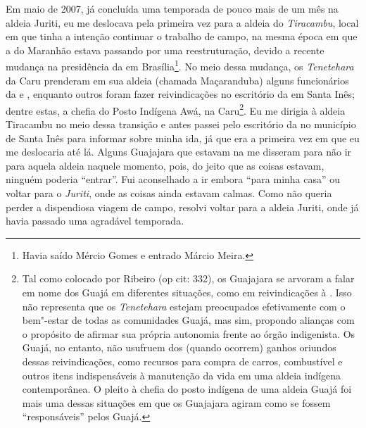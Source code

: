 Em maio de 2007, já concluída uma temporada de pouco mais de um mês na
aldeia Juriti, eu me deslocava pela primeira vez para a aldeia do 
\emph{Tiracambu}, local em que tinha a intenção continuar o trabalho de
campo, na mesma época em que a  do Maranhão estava passando por uma
reestruturação, devido a recente mudança na presidência da  em
Brasília\footnote{Havia saído Mércio Gomes e entrado Márcio Meira.}. No
meio dessa mudança, os \emph{Tenetehara} da  Caru prenderam em sua
aldeia (chamada Maçaranduba) alguns funcionários da  e ,
enquanto outros foram fazer reivindicações no escritório da  em
Santa Inês; dentre estas, a chefia do Posto Indígena Awá, na 
Caru\footnote{Tal como colocado por Ribeiro (op cit: 332), os Guajajara
  se arvoram a falar em nome dos Guajá em diferentes situações, como em
  reivindicações à . Isso não representa que os \emph{Tenetehara}
  estejam preocupados efetivamente com o bem"-estar de todas as
  comunidades Guajá, mas sim, propondo alianças com o propósito de
  afirmar sua própria autonomia frente ao órgão indigenista. Os Guajá,
  no entanto, não usufruem dos (quando ocorrem) ganhos oriundos dessas
  reivindicações, como recursos para compra de carros, combustível e
  outros itens indispensáveis à manutenção da vida em uma aldeia
  indígena contemporânea. O pleito à chefia do posto indígena de uma
  aldeia Guajá foi mais uma dessas situações em que os Guajajara agiram
  como se fossem ``responsáveis'' pelos Guajá.}. Eu me dirigia à aldeia
Tiracambu no meio dessa transição e antes passei pelo escritório da
 no município de Santa Inês para informar sobre minha ida, já que
era a primeira vez em que eu me deslocaria até lá. Alguns Guajajara que
estavam na  me disseram para não ir para aquela aldeia naquele
momento, pois, do jeito que as coisas estavam, ninguém poderia ``entrar''.
Fui aconselhado a ir embora ``para minha casa'' ou voltar para o 
\emph{Juriti}, onde as coisas ainda estavam calmas. Como não queria
perder a dispendiosa viagem de campo, resolvi voltar para a aldeia
Juriti, onde já havia passado uma agradável temporada.

